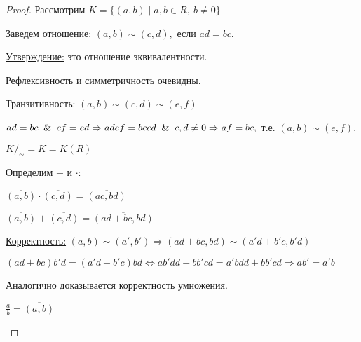 \begin{proof}
    Рассмотрим $K=\{(a,b)\mid a,b\in R,\ b\neq 0\}$

    Заведем отношение: $(a,b)\sim (c,d),$ если $ad=bc$.

    \underline{Утверждение:} это отношение эквивалентности.

    Рефлексивность и симметричность очевидны.

    Транзитивность: $(a,b)\sim (c,d)\sim (e,f)$

    $ad=bc\And cf=ed\Rightarrow adef=bced \And c,d\neq 0\Rightarrow af=bc,$ т.е. $(a,b)\sim (e,f)$.

    $K/_\sim =K= K(R)$

    Определим $+$ и $\cdot$:

    $\overline{(a,b)}\cdot \overline{(c,d)}=\overline{(ac,bd)}$

    $\overline{(a,b)}+ \overline{(c,d)}=\overline{(ad+bc,bd)}$

    \underline{Корректность:} $(a,b)\sim (a',b')\Rightarrow (ad+bc,bd)\sim(a'd+b'c,b'd)$

    $(ad+bc)b'd=(a'd+b'c)bd\Leftrightarrow ab'dd+bb'cd=a'bdd+bb'cd\Rightarrow ab'=a'b$

    Аналогично доказывается корректность умножения.

    \begin{designation}
        $\frac{a}{b}=\overline{(a,b)}$
    \end{designation}
\end{proof}